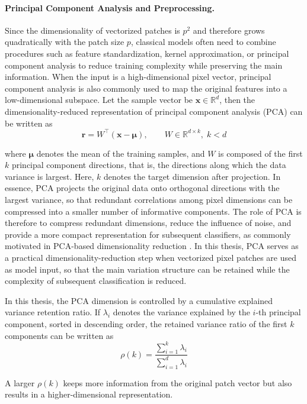 \paragraph{Principal Component Analysis and Preprocessing.} Since the
dimensionality of vectorized patches is $p^2$ and therefore grows quadratically
with the patch size $p$, classical models often need to combine procedures such
as feature standardization, kernel approximation, or principal component
analysis to reduce training complexity while preserving the main information.
When the input is a high-dimensional pixel vector, principal component analysis
is also commonly used to map the original features into a low-dimensional
subspace. Let the sample vector be $\mathbf{x}\in\mathbb{R}^{d}$, then the
dimensionality-reduced representation of principal component analysis (PCA)
\cite{zheng2021application} can be written as
\begin{equation}
    \mathbf{r}=W^\top(\mathbf{x}-\boldsymbol{\mu}),\qquad
    W\in\mathbb{R}^{d\times k},\; k<d
    \label{eq:pca-basic}
\end{equation}
\par where $\boldsymbol{\mu}$ denotes the mean of the training samples, and $W$
is composed of the first $k$ principal component directions, that is, the
directions along which the data variance is largest. Here, $k$ denotes the
target dimension after projection. In essence, PCA projects the original data
onto orthogonal directions with the largest variance, so that redundant
correlations among pixel dimensions can be compressed into a smaller number of
informative components. The role of PCA is therefore to compress redundant
dimensions, reduce the influence of noise, and provide a more compact
representation for subsequent classifiers, as commonly motivated in PCA-based
dimensionality reduction \cite{zheng2021application}. In this
thesis, PCA serves as a practical dimensionality-reduction step when vectorized
pixel patches are used as model input, so that the main variation structure can
be retained while the complexity of subsequent classification is reduced.

\par In this thesis, the PCA dimension is controlled by a cumulative explained
variance retention ratio. If $\lambda_i$ denotes the variance explained by the
$i$-th principal component, sorted in descending order, the retained variance
ratio of the first $k$ components can be written as
\begin{equation}
    \rho(k)=\frac{\sum_{i=1}^{k}\lambda_i}{\sum_{i=1}^{d}\lambda_i}
    \label{eq:pca-retention-ratio}
\end{equation}
\par A larger $\rho(k)$ keeps more information from the original patch vector
but also results in a higher-dimensional representation.

